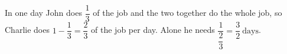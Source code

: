 In one day John does $\dfrac{1}{3}$ of the job and the two together do the whole job, so Charlie does $1-\dfrac{1}{3}=\dfrac{2}{3}$ of the job per day. Alone he needs $\dfrac{1}{\dfrac{2}{3}}=\boxed{\dfrac{3}{2}\ \text{days}}$.
